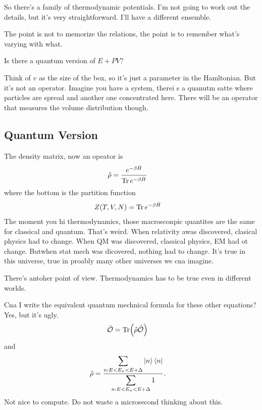 So there's a family of thermodynamic potentials.
I'm not going to work out the details,
but it's very straightforward.
I'll have a different ensemble.

The point is not to memorize the relations,
the point is to remember what's varying with what.

\begin{question}
    Is there a quantum version of $E+PV$?
\end{question}
Think of $v$ as the size of the box,
so it's just a parameter in the Hamltonian.
But it's not an operator.
Imagine you have a system,
therei s a quanutm satte where particles are spread
and another one concentrated here.
There will be an operator that measures the volume distribution though.

\subsection{Quantum Version}
The density matrix,
now an opeator is
\begin{align}
    \hat{\rho} &=
    \frac{e^{-\beta \hat{H}}}{\Tr e^{-\beta\hat{H}}}
\end{align}
where the bottom is the partition function
\begin{align}
    Z(T,V,N) &= \Tr e^{-\beta\hat{H}}
\end{align}
The moment you hi thermodynamics,
those macrosconpic quantites are the same for classical and quantum.
That's weird.
When relativity awas discovered,
clasical physics had to change.
When QM was discovered,
classical physics, EM had ot change.
Butwhen stat mech was dicovered,
nothing had to change.
It's true in this universe,
true in proably many other universes we cna imagine.

There's antoher point of view.
Thermodynamics has to be true even in different worlds.

Cna I write the equivalent quantum mechnical formula for these other equations?
Yes, but it's ugly.
\begin{align}
    \bar{\mathcal{O}} &=
    \Tr(\hat{\rho}\hat{\mathcal{O}})
\end{align}
and
\begin{align}
    \hat{\rho} &=
    \frac{\displaystyle \sum_{n:E<E_n<E+\Delta} \ket{n}\bra{n}}{%
    \displaystyle\sum_{n: E<E_n<E+\Delta} 1}.
\end{align}
Not nice to compute.
Do not waste a microsecond thinking about this.
